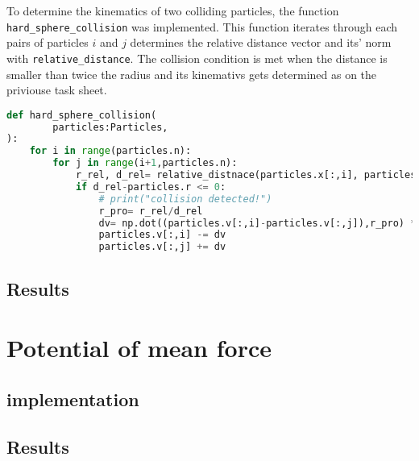 \documentclass{article}[a4paper]
\begin{document}
To determine the kinematics of two colliding particles, the function \texttt{hard\_sphere\_collision} was implemented. 
This function iterates through each pairs of particles $i$ and $j$ determines the relative distance vector and its' norm with \texttt{relative\_distance}. 
The collision condition is met when the distance is smaller than twice the radius and its kinemativs gets determined as on the priviouse task sheet. 
\begin{lstlisting}[language=Python]
def hard_sphere_collision(
        particles:Particles,
):
    for i in range(particles.n):
        for j in range(i+1,particles.n):
            r_rel, d_rel= relative_distnace(particles.x[:,i], particles.x[:,j],particles.box) 
            if d_rel-particles.r <= 0:
                # print("collision detected!")
                r_pro= r_rel/d_rel
                dv= np.dot((particles.v[:,i]-particles.v[:,j]),r_pro) * r_pro
                particles.v[:,i] -= dv
                particles.v[:,j] += dv
\end{lstlisting}




\subsection{Results}

\section{Potential of mean force}
\subsection{implementation}
\subsection{Results}
\end{document}

